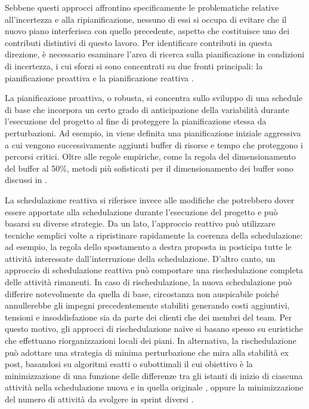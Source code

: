 \documentclass[12pt,a4paper,openright,twoside]{book}
\begin{document}
Sebbene questi approcci affrontino specificamente le problematiche relative all'incertezza e alla ripianificazione, nessuno di essi si occupa di evitare che il nuovo piano interferisca con quello precedente, aspetto che costituisce uno dei contributi distintivi di questo lavoro. Per identificare contributi in questa direzione, è necessario esaminare l'area di ricerca sulla pianificazione in condizioni di incertezza, i cui sforzi si sono concentrati su due fronti principali: la pianificazione proattiva e la pianificazione reattiva \cite{demeulemeester2002project}.

\vspace{1em}

La pianificazione proattiva, o robusta, si concentra sullo sviluppo di una schedule di base che incorpora un certo grado di anticipazione della variabilità durante l'esecuzione del progetto al fine di proteggere la pianificazione stessa da perturbazioni. Ad esempio, in \cite{doi:10.1177/875697280203300406} viene definita una pianificazione iniziale aggressiva a cui vengono successivamente aggiunti buffer di risorse e tempo che proteggono i percorsi critici. Oltre alle regole empiriche, come la regola del dimensionamento del buffer al 50\%, metodi più sofisticati per il dimensionamento dei buffer sono discussi in \cite{newbold1998project}.

La schedulazione reattiva si riferisce invece alle modifiche che potrebbero dover essere apportate alla schedulazione durante l'esecuzione del progetto e può basarsi su diverse strategie. Da un lato, l'approccio reattivo può utilizzare tecniche semplici volte a ripristinare rapidamente la coerenza della schedulazione: ad esempio, la regola dello spostamento a destra proposta in \cite{sadeh1993predictive} posticipa tutte le attività interessate dall'interruzione della schedulazione. D'altro canto, un approccio di schedulazione reattiva può comportare una rischedulazione completa delle attività rimanenti. In caso di rischedulazione, la nuova schedulazione può differire notevolmente da quella di base, circostanza non auspicabile poiché annullerebbe gli impegni precedentemente stabiliti generando costi aggiuntivi, tensioni e insoddisfazione sia da parte dei clienti che dei membri del team. Per questo motivo, gli approcci di rischedulazione naïve si basano spesso su euristiche che effettuano riorganizzazioni locali dei piani. In alternativa, la rischedulazione può adottare una strategia di minima perturbazione che mira alla stabilità ex post, basandosi su algoritmi esatti o subottimali il cui obiettivo è la minimizzazione di una funzione delle differenze tra gli istanti di inizio di ciascuna attività nella schedulazione nuova e in quella originale \cite{sakkout2000probe}, oppure la minimizzazione del numero di attività da svolgere in sprint diversi \cite{ALAGOZ2003523}.
\end{document}
